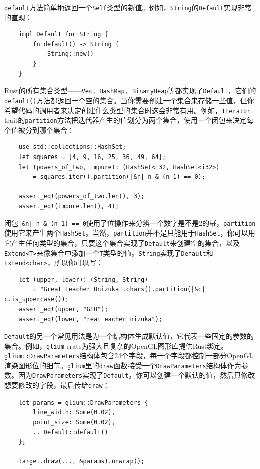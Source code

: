 \texttt{default}方法简单地返回一个\texttt{Self}类型的新值。例如，\texttt{String}的\texttt{Default}实现非常的直观：
\begin{verbatim}
    impl Default for String {
        fn default() -> String {
            String::new()
        }
    }    
\end{verbatim}

Rust的所有集合类型——\texttt{Vec, HashMap, BinaryHeap}等都实现了\texttt{Default}，它们的\texttt{default()}方法都返回一个空的集合。当你需要创建一个集合来存储一些值，但你希望代码的调用者来决定创建什么类型的集合时这会非常有用。例如，\texttt{Iterator} trait的\texttt{partition}方法把迭代器产生的值划分为两个集合，使用一个闭包来决定每个值被分到哪个集合：
\begin{verbatim}
    use std::collections::HashSet;
    let squares = [4, 9, 16, 25, 36, 49, 64];
    let (powers_of_two, impure): (HashSet<i32, HashSet<i32>)
        = squares.iter().partition(|&n| n & (n-1) == 0);
    
    assert_eq!(powers_of_two.len(), 3);
    assert_eq!(impure.len(), 4);
\end{verbatim}

闭包\texttt{|\&n| n \& (n-1) == 0}使用了位操作来分辨一个数字是不是2的幂，\texttt{partition}使用它来产生两个\texttt{HashSet}。当然，\texttt{partition}并不是只能用于\texttt{HashSet}，你可以用它产生任何类型的集合，只要这个集合实现了\texttt{Default}来创建空的集合，以及\texttt{Extend<T>}来像集合中添加一个\texttt{T}类型的值。\texttt{String}实现了\texttt{Default}和\texttt{Extend<char>}，所以你可以写：
\begin{verbatim}
    let (upper, lower): (String, String)
        = "Great Teacher Onizuka".chars().partition(|&c| c.is_uppercase());
    assert_eq!(upper, "GTO");
    assert_eq!(lower, "reat eacher nizuka");
\end{verbatim}

\texttt{Default}的另一个常见用法是为一个结构体生成默认值，它代表一些固定的参数的集合。例如，\texttt{glium} crate为强大且复杂的OpenGL图形库提供Rust绑定。\texttt{glium::DrawParameters}结构体包含24个字段，每一个字段都控制一部分OpenGL渲染图形位的细节。\texttt{glium}里的\texttt{draw}函数接受一个\texttt{DrawParameters}结构体作为参数。因为\texttt{DrawParameters}实现了\texttt{Default}，你可以创建一个默认的值，然后只修改想要修改的字段，最后传给\texttt{draw}：
\begin{verbatim}
    let params = glium::DrawParameters {
        line_width: Some(0.02),
        point_size: Some(0.02),
        .. Default::default()
    };

    target.draw(..., &params).unwrap();
\end{verbatim}

